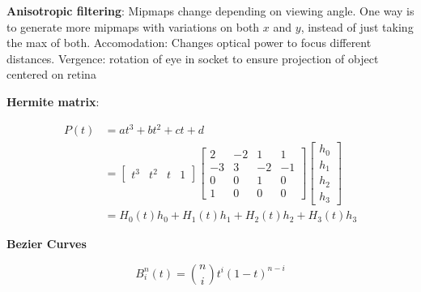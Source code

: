 \documentclass[9pt,landscape]{extarticle}
\begin{document}
\begin{multicols}{3}
\textbf{Anisotropic filtering}: Mipmaps change depending on viewing angle. One way is to generate more mipmaps with variations on both $x$ and $y$, instead of just taking the max of both. Accomodation: Changes optical power to focus different distances. Vergence: rotation of eye in socket to ensure projection of object centered on retina

\textbf{Hermite matrix}:

\begin{align*}
    P(t) &= at^3 + bt^2 + ct + d \\
    &=  \begin{bmatrix}
            t^3 & t^2 & t & 1
        \end{bmatrix}
        \begin{bmatrix}
            2 & -2 & 1 & 1 \\
            -3 & 3 & -2 & -1 \\
            0 & 0 & 1 & 0 \\
            1 & 0 & 0 & 0
        \end{bmatrix}
        \begin{bmatrix}
            h_0 \\
            h_1 \\
            h_2 \\
            h_3
        \end{bmatrix} \\
    &= H_0(t)h_0 + H_1(t)h_1 + H_2(t)h_2 + H_3(t)h_3
\end{align*}


\textbf{Bezier Curves}

$$B_i^n(t) = \binom{n}{i} t^i (1-t)^{n-i}$$


\end{multicols}
\end{document}
